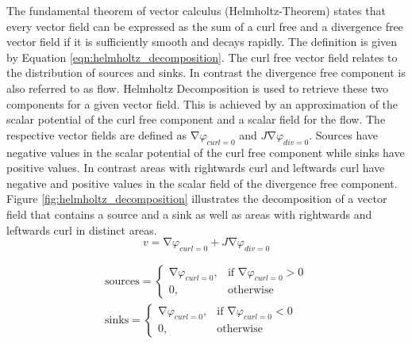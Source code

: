 The fundamental theorem of vector calculus (Helmholtz-Theorem) states that every vector field can be expressed as the sum of a curl free and a divergence free vector field if it is sufficiently smooth and decays rapidly. The definition is given by Equation \ref{eqn:helmholtz_decomposition}. The curl free vector field relates to the distribution of sources and sinks. In contrast the divergence free component is also referred to as flow. Helmholtz Decomposition is used to retrieve these two components for a given vector field. This is achieved by an approximation of the scalar potential of the curl free component and a scalar field for the flow. The respective vector fields are defined as $\mathrm{\nabla}\varphi_{curl=0}$ and $J\mathrm{\nabla}\varphi_{div=0}$. Sources have negative values in the scalar potential of the curl free component while sinks have positive values. In contrast areas with rightwards curl and leftwards curl have negative and positive values in the scalar field of the divergence free component. Figure \ref{fig:helmholtz_decomposition} illustrates the decomposition of a vector field that contains a source and a sink as well as areas with rightwards and leftwards curl in distinct areas.\\
\begin{equation}
  v=\mathrm{\nabla}\varphi_{curl=0}+J\mathrm{\nabla}\varphi_{div=0}
\label{eqn:helmholtz_decomposition}
\end{equation}

\begin{equation}
  \begin{array}{l}
  \text{sources}=
  \begin{cases}
      \mathrm{\nabla}\varphi_{curl=0},& \text{if } \mathrm{\nabla}\varphi_{curl=0} > 0\\
      0,              & \text{otherwise}
  \end{cases}\\
  \text{sinks}=
  \begin{cases}
      \mathrm{\nabla}\varphi_{curl=0},& \text{if } \mathrm{\nabla}\varphi_{curl=0} < 0\\
      0,              & \text{otherwise}
  \end{cases}
  \end{array}
  \label{eqn:sources_versus_sinks}
\end{equation}

